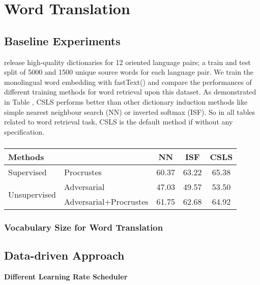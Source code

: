 \section{Word Translation}
\subsection{Baseline Experiments}
 \cite{conneau2017word} release high-quality dictionaries for 12 oriented language pairs; a train and test split of 5000 and 1500 unique source words for each language pair. We train the monolingual word embedding with fastText(\cite{bojanowski2016enriching}) and compare the performances of different training methods for word retrieval upon this dataset. As demonstrated in Table , CSLS performs better than other dictionary induction methods like simple nearest neighbour search (NN)  or inverted softmax (ISF). So in all tables related to word retrieval task, CSLS is the default method if without any specification.
\subsubsection{}
\begin{table}[H]
	\centering
	\begin{tabular}{llccc}
		\hline
		\multicolumn{2}{l}{Methods}                           & NN    & ISF   & CSLS  \\ \hline
		Supervised                    & Procrustes             & 60.37 & 63.22 & 65.38 \\ \hline
		\multirow{2}{*}{Unsupervised} & Adversarial            & 47.03 & 49.57 & 53.50 \\ \cline{2-5} 
		& Adversarial+Procrustes & 61.75 & 62.68 & 64.92 \\ \hline
	\end{tabular}
\end{table}
\subsubsection{Vocabulary Size for Word Translation}


\subsection{Data-driven Approach}
\textbf{Different Learning Rate Scheduler}\\
